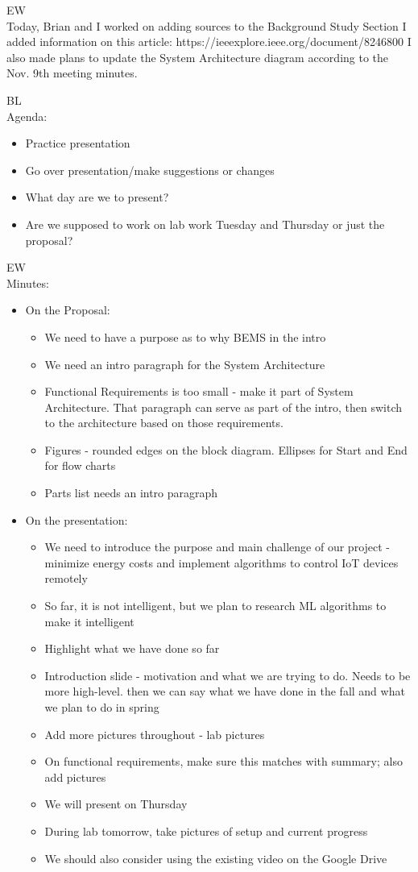\documentclass[fontsize=11pt, %
                             paper=letter, %
                             openany, %
                             captions=tableheading,
                             index=totoc,
                             hyperref]{labbook}
\begin{document}
EW\\
Today, Brian and I worked on adding sources to the Background Study Section I added information on this article:
https://ieeexplore.ieee.org/document/8246800
I also made plans to update the System Architecture diagram according to the Nov. 9th meeting minutes.

BL\\
Agenda:
\begin{itemize}
\item Practice presentation
\item Go over presentation/make suggestions or changes
\item What day are we to present?
\item Are we supposed to work on lab work Tuesday and Thursday or just the proposal?
\end{itemize}

EW\\
Minutes:
\begin{itemize}
\item On the Proposal:
\begin{itemize}
\item We need to have a purpose as to why BEMS in the intro
\item We need an intro paragraph for the System Architecture
\item Functional Requirements is too small - make it part of System Architecture. That paragraph can serve as part of the intro, then switch to the architecture based on those requirements.
\item Figures - rounded edges on the block diagram. Ellipses for Start and End for flow charts
\item Parts list needs an intro paragraph
\end{itemize}
\item On the presentation:
\begin{itemize}
\item We need to introduce the purpose and main challenge of our project - minimize energy costs and implement algorithms to control IoT devices remotely
\item So far, it is not intelligent, but we plan to research ML algorithms to make it intelligent
\item Highlight what we have done so far
\item Introduction slide - motivation and what we are trying to do. Needs to be more high-level. then we can say what we have done in the fall and what we plan to do in spring
\item Add more pictures throughout - lab pictures
\item On functional requirements, make sure this matches with summary; also add pictures
\item We will present on Thursday
\item During lab tomorrow, take pictures of setup and current progress
\item We should also consider using the existing video on the Google Drive
\end{itemize}
\end{itemize}
\end{document}
